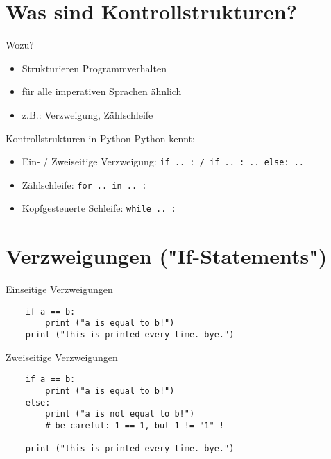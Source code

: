 \section{Was sind Kontrollstrukturen?}
\begin{frame}{Wozu?}
    \begin{itemize}
        \item Strukturieren Programmverhalten
        \item für alle imperativen Sprachen ähnlich
        \item z.B.: Verzweigung, Zählschleife
    \end{itemize}
\end{frame}



\begin{frame}{Kontrollstrukturen in Python}
    Python kennt:
    \begin{itemize}
        \item Ein- / Zweiseitige Verzweigung: \texttt{if .. : / if .. : .. else: ..}
        \item Zählschleife: \texttt{for .. in .. :}
        \item Kopfgesteuerte Schleife: \texttt{while .. :}
    \end{itemize}
\end{frame}
\section{Verzweigungen ("{}If-Statements"{})}
\begin{frame}[fragile]{Einseitige Verzweigungen}
    \begin{lstlisting}
    if a == b:
        print ("a is equal to b!")
    print ("this is printed every time. bye.")
    \end{lstlisting}
\end{frame}

\begin{frame}[fragile]{Zweiseitige Verzweigungen}
    \begin{lstlisting}
    if a == b:
        print ("a is equal to b!")
    else:
        print ("a is not equal to b!")
        # be careful: 1 == 1, but 1 != "1" !
    
    print ("this is printed every time. bye.")
    \end{lstlisting}
\end{frame}

